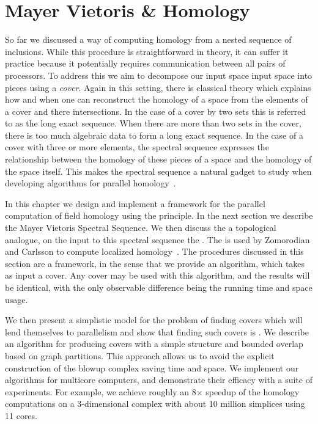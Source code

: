 \chapter{Mayer Vietoris \& Homology}
So far we discussed a way of computing homology from a 
nested sequence of inclusions. While this procedure is straightforward in theory, it can suffer it practice
because it potentially requires communication between all pairs of processors. To address this
we aim to decompose our input space input space into pieces using a \emph{cover}. Again in this setting, 
there is classical theory which explains how and when one can reconstruct the homology of a space
from the elements of a cover and there intersections. In the case of a cover by two sets this is referred to as
the \mv long exact sequence. When there are more than two sets in the cover, 
there is too much algebraic data to form a long exact sequence. 
In the case of a cover with three or more elements, the \mv spectral sequence expresses 
the relationship between the homology of these pieces of a space and the homology of the space itself.
This makes the \mv spectral sequence a natural gadget to study when developing algorithms for parallel homology~\cite{hatcher}. 

In this chapter we design and implement a framework for the parallel computation of field homology using the \mv principle. In the next section we describe the Mayer Vietoris Spectral Sequence. We then discuss the a topological analogue, on the input to this spectral sequence the \mvb{}.  
The \mvb{} is used by Zomorodian and Carlsson to compute localized homology~\cite{zc-lh-08}.  The procedures discussed in this section 
are a framework, in the sense that we provide an algorithm, which takes as input a cover. Any cover may be used with this algorithm,
and the results will be identical, with the only observable difference being the running time and space usage. 

We then present a simplistic model for the problem of finding covers which will lend themselves to parallelism and show that finding such covers is \NPH{}.
We describe an algorithm for producing covers with a simple structure and bounded overlap based on graph partitions. This approach allows
us to avoid the explicit construction of the blowup complex saving time and space. We implement our algorithms for multicore computers, 
and demonstrate their efficacy with a suite of experiments.  For example, we achieve roughly an 8$\times$ 
speedup of the homology computations on a 3-dimensional complex with about 10 million simplices using 11 cores.

